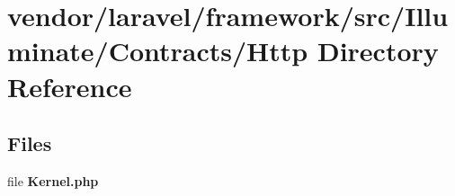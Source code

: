 \section{vendor/laravel/framework/src/\+Illuminate/\+Contracts/\+Http Directory Reference}
\label{dir_60b0ef7e3c522e7d621814b8fb46e54a}
\subsection*{Files}
\begin{DoxyCompactItemize}
\item 
file {\bf Kernel.\+php}
\end{DoxyCompactItemize}
